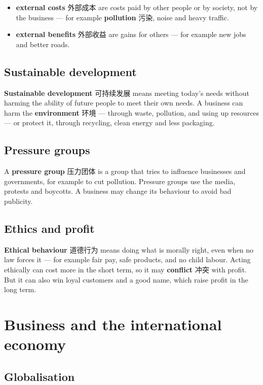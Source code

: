 \documentclass[11pt]{article}
\begin{document}
\begin{itemize}
\item \textbf{external costs} 外部成本 are costs paid by other people or by society, not by the business — for example \textbf{pollution} 污染, noise and heavy traffic.

\item \textbf{external benefits} 外部收益 are gains for others — for example new jobs and better roads.

\end{itemize}

\subsection*{Sustainable development}

\textbf{Sustainable development} 可持续发展 means meeting today's needs without harming the ability of future people to meet their own needs. A business can harm the \textbf{environment} 环境 — through waste, pollution, and using up resources — or protect it, through recycling, clean energy and less packaging.

\subsection*{Pressure groups}

A \textbf{pressure group} 压力团体 is a group that tries to influence businesses and governments, for example to cut pollution. Pressure groups use the media, protests and boycotts. A business may change its behaviour to avoid bad publicity.

\subsection*{Ethics and profit}

\textbf{Ethical behaviour} 道德行为 means doing what is morally right, even when no law forces it — for example fair pay, safe products, and no child labour. Acting ethically can cost more in the short term, so it may \textbf{conflict} 冲突 with profit. But it can also win loyal customers and a good name, which raise profit in the long term.

\section*{Business and the international economy}

\subsection*{Globalisation}
\end{document}
